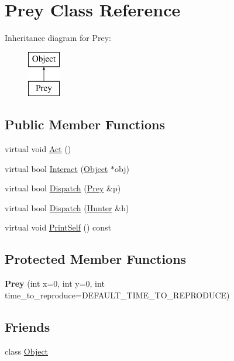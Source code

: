 \hypertarget{classPrey}{
\section{Prey Class Reference}
\label{classPrey}
}
Inheritance diagram for Prey:\begin{figure}[H]
\begin{center}
\leavevmode
\includegraphics[height=2cm]{classPrey}
\end{center}
\end{figure}
\subsection*{Public Member Functions}
\begin{DoxyCompactItemize}
\item 
virtual void \hyperlink{classPrey_a940c0a8879376b15dedb7debf9b8f1c8}{Act} ()
\item 
virtual bool \hyperlink{classPrey_a3f46445d442e33d47edcc94bf5f537b4}{Interact} (\hyperlink{classObject}{Object} $\ast$obj)
\item 
virtual bool \hyperlink{classPrey_af37fdbe20f8868903d1ffdf4fb303946}{Dispatch} (\hyperlink{classPrey}{Prey} \&p)
\item 
virtual bool \hyperlink{classPrey_ac6b00aecc20017e58cabef00be961c6f}{Dispatch} (\hyperlink{classHunter}{Hunter} \&h)
\item 
virtual void \hyperlink{classPrey_a46d5447bf01e734154f8d3f2f27c8fcd}{PrintSelf} () const 
\end{DoxyCompactItemize}
\subsection*{Protected Member Functions}
\begin{DoxyCompactItemize}
\item 
\hypertarget{classPrey_a1e65463a2ed66b174fcd735676b0d68e}{
{\bfseries Prey} (int x=0, int y=0, int time\_\-to\_\-reproduce=DEFAULT\_\-TIME\_\-TO\_\-REPRODUCE)}
\label{classPrey_a1e65463a2ed66b174fcd735676b0d68e}

\end{DoxyCompactItemize}
\subsection*{Friends}
\begin{DoxyCompactItemize}
\item 
\hypertarget{classPrey_a0720b5f434e636e22a3ed34f847eec57}{
class \hyperlink{classPrey_a0720b5f434e636e22a3ed34f847eec57}{Object}}
\label{classPrey_a0720b5f434e636e22a3ed34f847eec57}

\end{DoxyCompactItemize}


